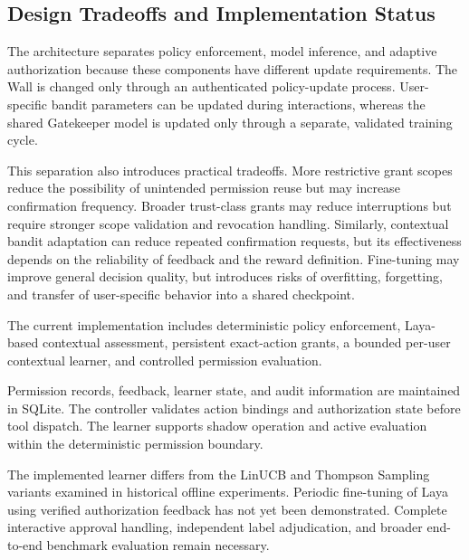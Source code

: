 \documentclass[10pt,conference]{IEEEtran}
\begin{document}

\subsection{Design Tradeoffs and Implementation Status}

The architecture separates policy enforcement, model inference, and adaptive authorization because these components have different update requirements. The Wall is changed only through an authenticated policy-update process. User-specific bandit parameters can be updated during interactions, whereas the shared Gatekeeper model is updated only through a separate, validated training cycle.

This separation also introduces practical tradeoffs. More restrictive grant scopes reduce the possibility of unintended permission reuse but may increase confirmation frequency. Broader trust-class grants may reduce interruptions but require stronger scope validation and revocation handling. Similarly, contextual bandit adaptation can reduce repeated confirmation requests, but its effectiveness depends on the reliability of feedback and the reward definition. Fine-tuning may improve general decision quality, but introduces risks of overfitting, forgetting, and transfer of user-specific behavior into a shared checkpoint.


The current implementation includes deterministic
policy enforcement, Laya-based contextual
assessment, persistent exact-action grants,
a bounded per-user contextual learner, and
controlled permission evaluation.

Permission records, feedback, learner state,
and audit information are maintained in SQLite.
The controller validates action bindings and
authorization state before tool dispatch.
The learner supports shadow operation and
active evaluation within the deterministic
permission boundary.

The implemented learner differs from the
LinUCB and Thompson Sampling variants
examined in historical offline experiments.
Periodic fine-tuning of Laya using verified
authorization feedback has not yet been
demonstrated. Complete interactive approval
handling, independent label adjudication,
and broader end-to-end benchmark evaluation
remain necessary.


\end{document}
